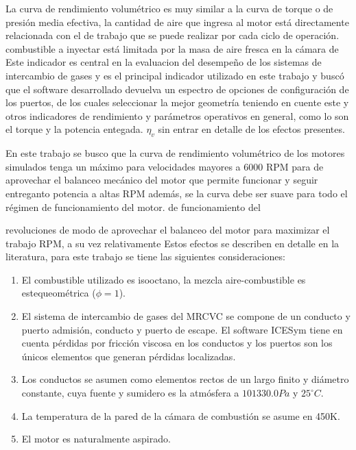 La curva de rendimiento volumétrico es muy similar a la curva de torque o de
presión media efectiva, la cantidad de aire que ingresa al motor está
directamente relacionada con el de trabajo que se puede realizar por cada ciclo
de operación.
%
combustible a inyectar está limitada por la masa de aire fresca en la cámara de
%
Este indicador es central en la evaluacion del desempeño de los sistemas de
intercambio de gases y es el principal indicador utilizado en este trabajo y
buscó que el software desarrollado devuelva un espectro de opciones de
configuración de los puertos, de los cuales seleccionar la mejor geometría
teniendo en cuente este y otros indicadores de rendimiento y parámetros
operativos en general, como lo son el torque y la potencia entegada.
%
$\eta_v$ sin entrar en detalle de los efectos presentes.

En este trabajo se busco que la curva de rendimiento volumétrico de los motores
simulados tenga un máximo para velocidades mayores a 6000 RPM para de aprovechar
el balanceo mecánico del motor que permite funcionar y seguir entreganto
potencia a altas RPM además, se la curva debe ser suave para todo el régimen de
funcionamiento del motor.
%
de funcionamiento del %

revoluciones de modo de aprovechar el balanceo del motor para maximizar el
trabajo %
RPM, a su vez %
relativamente %
%
Estos efectos se describen en detalle en la literatura\parencite{heywood}, para
este trabajo se tiene las siguientes consideraciones:

\begin{enumerate}
    \item El combustible utilizado es isooctano, la mezcla aire-combustible es
estequeométrica ($\phi=1$).
    \item El sistema de intercambio de gases del MRCVC se compone de un conducto
y puerto admisión, conducto y puerto de escape.
        El software ICESym tiene en cuenta pérdidas por fricción viscosa en los
conductos y los puertos son los únicos elementos que generan pérdidas
localizadas.
    \item Los conductos se asumen como elementos rectos de un largo finito y
diámetro constante, cuya fuente y sumidero es la atmósfera a $101330.0 Pa$ y
$25^{\circ}C$.
    \item La temperatura de la pared de la cámara de combustión se asume en
450K.
    \item El motor es naturalmente aspirado.
\end{enumerate}

